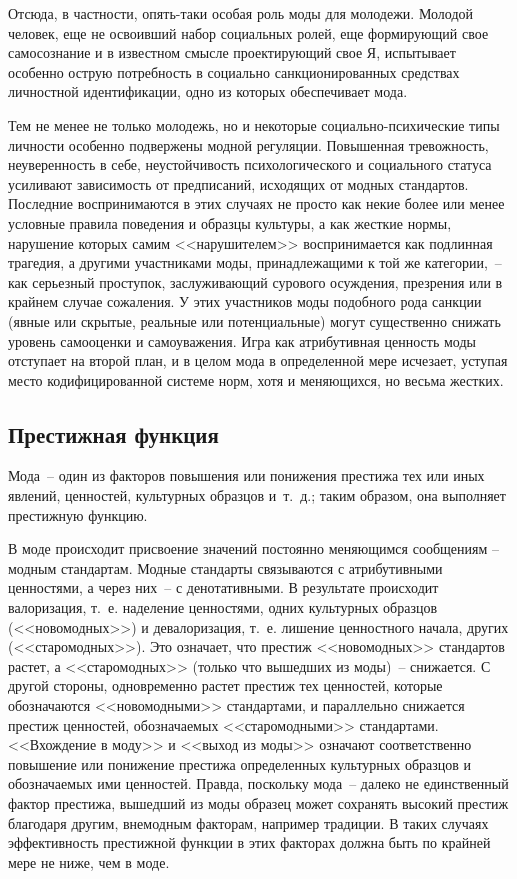   Отсюда, в частности, опять-таки особая роль моды для молодежи. Молодой
  человек, еще не освоивший набор социальных ролей, еще формирующий свое
  самосознание и в известном смысле проектирующий свое Я, испытывает особенно
  острую потребность в социально санкционированных средствах личностной
  идентификации, одно из которых обеспечивает мода.
  
  Тем не менее не только молодежь, но и некоторые социально-психические типы
  личности особенно подвержены модной регуляции. Повышенная тревожность,
  неуверенность в себе, неустойчивость психологического и социального статуса
  усиливают зависимость от предписаний, исходящих от модных стандартов.
  Последние воспринимаются в этих случаях не просто как некие более или менее
  условные правила поведения и образцы культуры, а как жесткие нормы, нарушение
  которых самим <<нарушителем>> воспринимается как подлинная трагедия, а другими
  участниками моды, принадлежащими к той же категории,~-- как серьезный
  проступок, заслуживающий сурового осуждения, презрения или в крайнем случае
  сожаления. У этих участников моды подобного рода санкции (явные или скрытые,
  реальные или потенциальные) могут существенно снижать уровень самооценки и
  самоуважения. Игра как атрибутивная ценность моды отступает на второй план, и
  в целом мода в определенной мере исчезает, уступая место кодифицированной
  системе норм, хотя и меняющихся, но весьма жестких.
  
  \subsection{Престижная функция}
  
  Мода~-- один из факторов повышения или понижения престижа тех или иных явлений,
  ценностей, культурных образцов и~т.~д.; таким образом, она выполняет престижную
  функцию.
  
  В моде происходит присвоение значений постоянно меняющимся сообщениям – модным
  стандартам. Модные стандарты связываются с атрибутивными ценностями, а через
  них~-- с денотативными. В результате происходит валоризация, т.~е. наделение
  ценностями, одних культурных образцов (<<новомодных>>) и девалоризация, т.~е.
  лишение ценностного начала, других (<<старомодных>>). Это означает, что
  престиж <<новомодных>> стандартов растет, а <<старомодных>> (только что
  вышедших из моды)~-- снижается. С другой стороны, одновременно растет престиж
  тех ценностей, которые обозначаются <<новомодными>> стандартами, и параллельно
  снижается престиж ценностей, обозначаемых <<старомодными>> стандартами.
  <<Вхождение в моду>> и <<выход из моды>> означают соответственно повышение или
  понижение престижа определенных культурных образцов и обозначаемых ими
  ценностей. Правда, поскольку мода~-- далеко не единственный фактор престижа,
  вышедший из моды образец может сохранять высокий престиж благодаря другим,
  внемодным факторам, например традиции. В таких случаях эффективность
  престижной функции в этих факторах должна быть по крайней мере не ниже, чем в
  моде.
  
